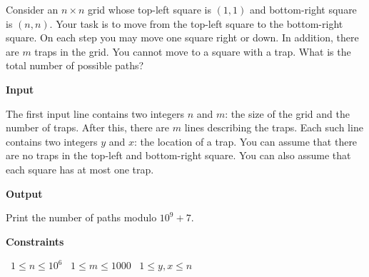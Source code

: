 Consider an $n \times n$ grid whose top-left square is $(1,1)$ and bottom-right square is $(n,n)$.
Your task is to move from the top-left square to the bottom-right square. On each step you may move one square right or down. In addition, there are $m$ traps in the grid. You cannot move to a square with a trap.
What is the total number of possible paths?

\vspace{0.3cm}\noindent\textbf{Input}

The first input line contains two integers $n$ and $m$: the size of the grid and the number of traps.
After this, there are $m$ lines describing the traps. Each such line contains two integers $y$ and $x$: the location of a trap.
You can assume that there are no traps in the top-left and bottom-right square. You can also assume that each square has at most one trap.

\vspace{0.3cm}\noindent\textbf{Output}

Print the number of paths modulo $10^9+7$.

\vspace{0.3cm}\noindent\textbf{Constraints}

\textbullet\ $1 \le n \le 10^6$
\textbullet\ $1 \le m \le 1000$
\textbullet\ $1 \le y,x \le n$